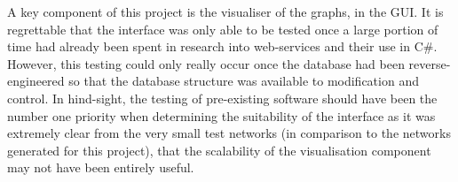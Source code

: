A key component of this project is the visualiser of the graphs, in the GUI. It is regrettable that the interface was only able to be tested once a large portion of time had already been spent in research into web-services and their use in C\#. However, this testing could only really occur once the database had been reverse-engineered so that the database structure was available to modification and control. In hind-sight, the testing of pre-existing software should have been the number one priority when determining the suitability of the interface as it was extremely clear from the very small test networks (in comparison to the networks generated for this project), that the scalability of the visualisation component may not have been entirely useful.


